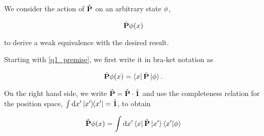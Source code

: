 
We consider the action of $\hat{\textbf{P}}$ on an arbitrary
state $\phi$, 

\begin{equation}
    \hat{\textbf{P}} \phi(x) 
    \label{q1_premise}
\end{equation}

to derive a weak equivalence with the desired result.

Starting with \cref{q1_premise}, we first write it in
bra-ket notation as

\begin{equation}
    \hat{\textbf{P}} \phi(x) = 
        \bra{x} \hat{\textbf{P}} \ket{\phi}.
\end{equation}

On the right hand side, we write $\hat{\textbf{P}} = \hat{\textbf{P}} \cdot \hat{\textbf{1}}$
and use the completeness relation for the position space,
$\int \dd{x'} \ketbra{x'}{x'} = \hat{\textbf{1}}$,
to obtain

\begin{equation}
    \hat{\textbf{P}} \phi(x) = \int \dd{x'} \bra{x} 
                                        \hat{\textbf{P}} \ket{x'}
                                        \braket{x'}{\phi}
\end{equation}

